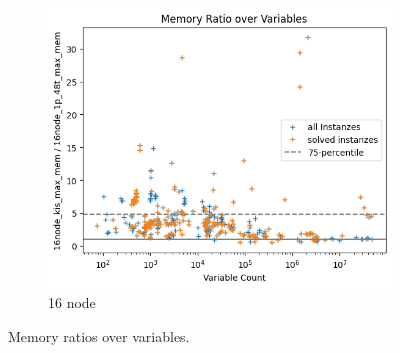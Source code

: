 \documentclass[12pt,a4paper,twoside]{scrartcl}
\numberwithin{equation}{section}
\begin{document}
\begin{figure}
  \begin{subfigure}[c]{.4\textwidth}
    \center
    \includegraphics[scale=.3]{plots/16node_compare/mem_ratio_over_vars.png}
    \caption{16 node}
    \label{fig:memRatiosVars16node}
  \end{subfigure}
  \caption{Memory ratios over variables.}
  \label{fig:memRatiosVars}
\end{figure}
\end{document}
